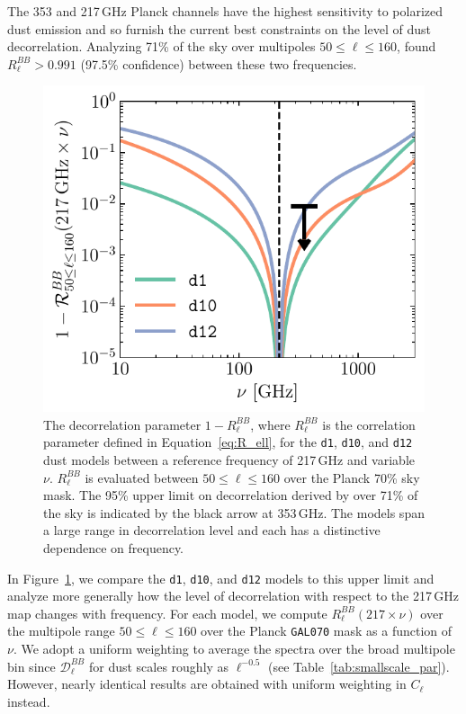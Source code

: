 \documentclass[twocolumn]{aastex631}
\begin{document}
The 353 and 217\,GHz Planck channels have the highest sensitivity to polarized dust emission and so furnish the current best constraints on the level of dust decorrelation. Analyzing 71\% of the sky over multipoles $50 \leq \ell \leq 160$, \citet{planck2016-l11A} found $R_\ell^{BB} > 0.991$ (97.5\% confidence) between these two frequencies.

\begin{figure}
    \centering
    \includegraphics[width=\columnwidth]{figures/decorrelation_dust.pdf}
    \caption{The decorrelation parameter $1-R_\ell^{BB}$, where $R_\ell^{BB}$ is the correlation parameter defined in Equation~\eqref{eq:R_ell}, for the \texttt{d1}, \texttt{d10}, and \texttt{d12} dust models between a reference frequency of 217\,GHz and variable $\nu$. $R_\ell^{BB}$ is evaluated between $50 \leq \ell \leq 160$ over the Planck 70\% sky mask. The 95\% upper limit on decorrelation derived by \citet{planck2016-l11A} over 71\% of the sky is indicated by the black arrow at 353\,GHz. The models span a large range in decorrelation level and each has a distinctive dependence on frequency.}
    \label{fig:decorrelation}
\end{figure}

In Figure~\ref{fig:decorrelation}, we compare the \texttt{d1}, \texttt{d10}, and \texttt{d12} models to this upper limit and analyze more generally how the level of decorrelation with respect to the 217\,GHz map changes with frequency. For each model, we compute $R_\ell^{BB}\left(217\times\nu\right)$ over the multipole range $50 \leq \ell \leq 160$ over the Planck \texttt{GAL070} mask as a function of $\nu$. We adopt a uniform weighting to average the spectra over the broad multipole bin since $\mathcal{D}_\ell^{BB}$ for dust scales roughly as $\ell^{-0.5}$ (see Table~\ref{tab:smallscale_par}). However, nearly identical results are obtained with uniform weighting in $C_\ell$ instead.
\end{document}
